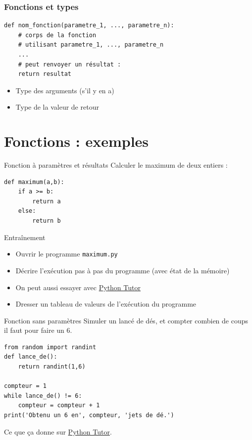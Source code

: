 \documentclass{beamer}
\begin{document}
\begin{frame}[fragile]
  \frametitle{Fonctions et types}

\begin{verbatim}
def nom_fonction(parametre_1, ..., parametre_n):
    # corps de la fonction
    # utilisant parametre_1, ..., parametre_n
    ...
    # peut renvoyer un résultat :
    return resultat
\end{verbatim}

  \begin{itemize}
  \item[\MVRightArrow{}] Type des arguments (s'il y en a)
  \item[\MVRightArrow{}] Type de la valeur de retour
  \end{itemize}
\end{frame}

\section{Fonctions : exemples}

\begin{frame}[fragile]{Fonction à paramètres et résultats}
  Calculer le maximum de deux entiers :
  \pause
\begin{verbatim}
def maximum(a,b):
    if a >= b:
        return a
    else:
        return b
\end{verbatim}
\pause
  \begin{block}{Entraînement}
    \begin{itemize}
    \item Ouvrir le programme \texttt{maximum.py}
    \item Décrire l'exécution pas à pas du programme (avec état de la mémoire)
    \item On peut aussi essayer avec \href{https://pythontutor.com/}{Python Tutor}
    \item Dresser un tableau de valeurs de l'exécution du programme
    \end{itemize}
  \end{block}
\end{frame}

\begin{frame}[fragile]{Fonction sans paramètres}
  Simuler un lancé de dés, et compter combien de coups il faut pour faire un 6.
  \pause
\begin{verbatim}
from random import randint
def lance_de():
    return randint(1,6)

compteur = 1
while lance_de() != 6:
    compteur = compteur + 1
print('Obtenu un 6 en', compteur, 'jets de dé.')
\end{verbatim}
  \pause
  Ce que ça donne sur \href{https://pythontutor.com/}{Python Tutor}.
\end{frame}
\end{document}
